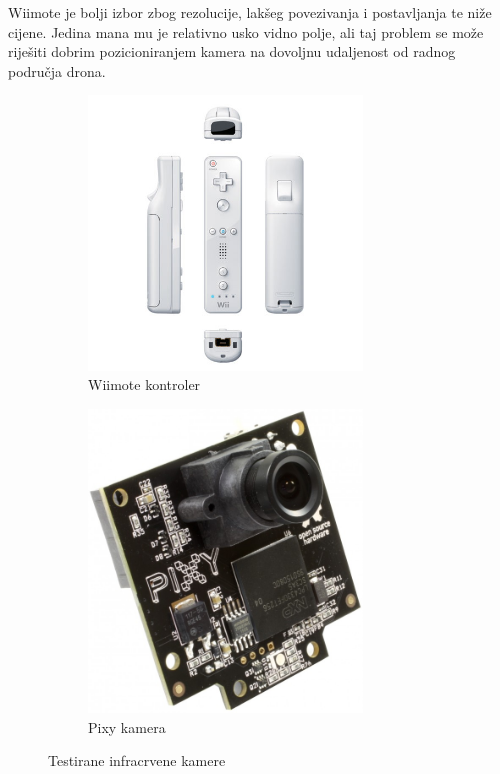 \documentclass[times, utf8, diplomski]{fer}
\begin{document}
Wiimote je bolji izbor zbog rezolucije, lakšeg povezivanja i postavljanja te niže cijene. Jedina mana mu je relativno usko vidno polje, ali taj problem se može riješiti dobrim pozicioniranjem kamera na dovoljnu udaljenost od radnog područja drona.

\begin{figure}[h]
\begin{subfigure}[b]{.5\textwidth}
\centering
	\includegraphics[width=0.8\textwidth]{Nintendo-Wiimote}
	\caption{Wiimote kontroler}
	\label{fig:wiimote}
\end{subfigure}
\begin{subfigure}[b]{.4\textwidth}
	\centering
	\includegraphics[width=0.8\textwidth]{pixy}
	\caption{Pixy kamera}
	\label{fig:pixy}
\end{subfigure}
\caption{Testirane infracrvene kamere}
\label{fig:cams}
\end{figure}
\end{document}

